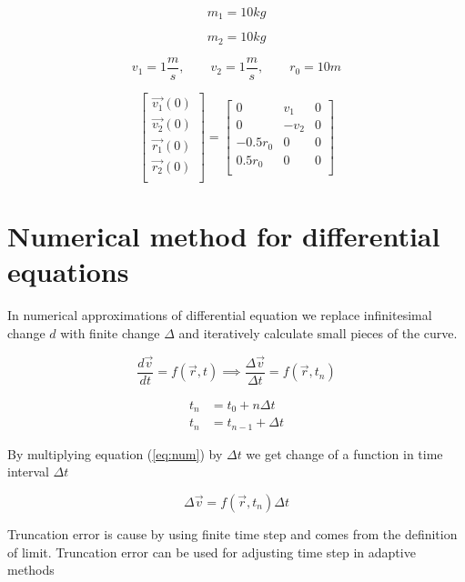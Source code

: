 \documentclass[english,12pt,a4paper]{report}
\begin{document}
		$$ m_1 = 10 kg$$
		
		$$ m_2 = 10 kg $$
	
	$$
	v_1 = 1 \frac{m}{s}
	, \qquad v_2 = 1 \frac{m}{s}
	, \qquad r_0 = 10 m
	$$
	
	\begin{equation}
		\begin{bmatrix}
			\vec{v_1}(0)\\
			\vec{v_2}(0)\\
			\vec{r_1}(0)\\
			\vec{r_2}(0)\\
		\end{bmatrix}
		=
		\begin{bmatrix}
			0 & v_1 & 0\\
			0 & -v_2 & 0\\
			-0.5r_0 & 0 & 0\\
			0.5r_0 & 0 & 0\\
		\end{bmatrix}
	\end{equation}
	
	\chapter{Numerical method for differential equations}
	
	In numerical approximations of differential equation we replace infinitesimal change $d$ with finite change $\Delta$ and iteratively calculate small pieces of the curve.
	
	\begin{equation}\label{eq:num}
		\frac{d \vec{v}}{dt} = f(\vec{r}, t) \implies \frac{\Delta \vec{v}}{\Delta t} = f(\vec{r}, t_n)
	\end{equation}
	
	\begin{equation}
		\begin{split}
			t_n &= t_0 + n \Delta t \\
			t_n &= t_{n-1} + \Delta t
		\end{split}
	\end{equation}
	
	By multiplying equation (\ref{eq:num}) by $\Delta t$ we get change of a function in time interval $\Delta t$
	
	\begin{equation}
		\Delta \vec{v} = f(\vec{r}, t_n) \Delta t
	\end{equation}
	
	Truncation error is cause by using finite time step and comes from the definition of limit. Truncation error can be used for adjusting time step in adaptive methods
	
\end{document}
